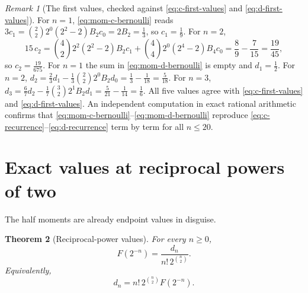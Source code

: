 \documentclass[11pt,oneside]{article}
\newtheorem{theorem}{Theorem}[section]
\theoremstyle{definition}
\theoremstyle{remark}
\newtheorem{remark}[theorem]{Remark}
\begin{document}
\begin{remark}[The first values, checked against \eqref{eq:c-first-values} and \eqref{eq:d-first-values}]
                                                           \label{rem:mom-bernoulli-check}
For $n=1$, \eqref{eq:mom-c-bernoulli} reads
$3c_1=\binom22 2^0(2^2-2)B_2c_0=2B_2=\tfrac13$, so $c_1=\tfrac19$.  For $n=2$,
\begin{equation*}
 15\,c_2=\binom42 2^2(2^2-2)B_2c_1+\binom44 2^0(2^4-2)B_4c_0
 =\frac89-\frac7{15}=\frac{19}{45},
\end{equation*}
so $c_2=\tfrac{19}{675}$.  For $n=1$ the sum in \eqref{eq:mom-d-bernoulli} is empty and
$d_1=\tfrac12$.  For $n=2$,
$d_2=\tfrac23d_1-\tfrac13\binom22 2^0B_2d_0=\tfrac13-\tfrac1{18}=\tfrac5{18}$.  For $n=3$,
$d_3=\tfrac67d_2-\tfrac17\binom32 2^1B_2d_1=\tfrac5{21}-\tfrac1{14}=\tfrac16$.  All five
values agree with \eqref{eq:c-first-values} and \eqref{eq:d-first-values}.  An independent
computation in exact rational arithmetic confirms that
\eqref{eq:mom-c-bernoulli}--\eqref{eq:mom-d-bernoulli} reproduce
\eqref{eq:c-recurrence}--\eqref{eq:d-recurrence} term by term for all $n\le20$.
\end{remark}

\section{Exact values at reciprocal powers of two}
\label{sec:inverse-powers}

The half moments are already endpoint values in disguise.

\begin{theorem}[Reciprocal-power values]
For every $n\ge0$,
\begin{equation}
 F(2^{-n})=\frac{d_n}{n!\,2^{\binom n2}}.                  \label{eq:F-inverse-power}
\end{equation}
Equivalently,
\begin{equation}
 d_n=n!\,2^{\binom n2}F(2^{-n}).                           \label{eq:d-F-inverse}
\end{equation}
\end{theorem}
\end{document}
